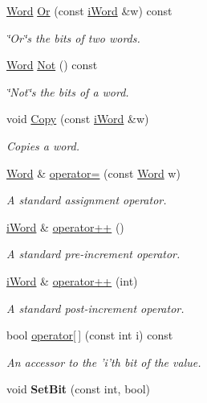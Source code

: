 \begin{DoxyCompactItemize}
\hyperlink{classWord}{Word} \hyperlink{classWord_a681da292897265ae47f144a99d49d9ec}{Or} (const \hyperlink{classiWord}{iWord} \&w) const 
\begin{DoxyCompactList}\small\item\em \char`\"{}Or\char`\"{}s the bits of two words. \item\end{DoxyCompactList}\item 
\hyperlink{classWord}{Word} \hyperlink{classWord_afdecfa9e3f2fda36496f249617a4cef5}{Not} () const 
\begin{DoxyCompactList}\small\item\em \char`\"{}Not\char`\"{}s the bits of a word. \item\end{DoxyCompactList}\item 
void \hyperlink{classWord_a8c094d866fe9af5da5d32c98430a86f8}{Copy} (const \hyperlink{classiWord}{iWord} \&w)
\begin{DoxyCompactList}\small\item\em Copies a word. \item\end{DoxyCompactList}\item 
\hyperlink{classWord}{Word} \& \hyperlink{classWord_a2a3d8ab2639aada7a1aafcd3acd3900f}{operator=} (const \hyperlink{classWord}{Word} w)
\begin{DoxyCompactList}\small\item\em A standard assignment operator. \item\end{DoxyCompactList}\item 
\hyperlink{classiWord}{iWord} \& \hyperlink{classWord_a3837f49bcb44597e6d738ccb0eeed144}{operator++} ()
\begin{DoxyCompactList}\small\item\em A standard pre-\/increment operator. \item\end{DoxyCompactList}\item 
\hyperlink{classiWord}{iWord} \& \hyperlink{classWord_ae921b75d263be790fd150c5962445163}{operator++} (int)
\begin{DoxyCompactList}\small\item\em A standard post-\/increment operator. \item\end{DoxyCompactList}\item 
bool \hyperlink{classWord_a0b08a81ced05b38d3d719ef70ecb3215}{operator\mbox{[}$\,$\mbox{]}} (const int i) const 
\begin{DoxyCompactList}\small\item\em An accessor to the 'i'th bit of the value. \item\end{DoxyCompactList}\item 
\hypertarget{classWord_a8449f26fb840ca22dcc2ba3fc816d068}{
void {\bfseries SetBit} (const int, bool)}
\label{classWord_a8449f26fb840ca22dcc2ba3fc816d068}

\end{DoxyCompactItemize}
